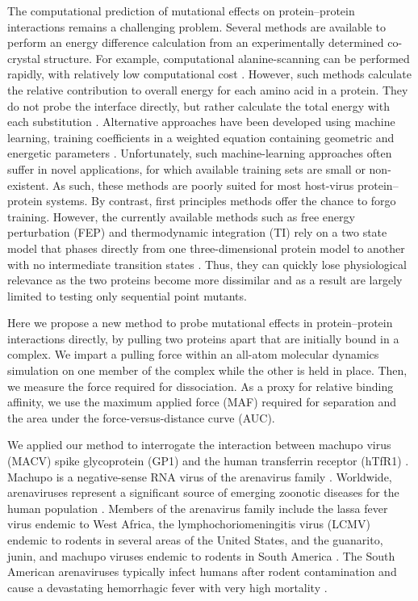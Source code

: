 \documentclass[12pt]{article}
\begin{document}
The computational prediction of mutational effects on protein--protein interactions remains a challenging problem. Several methods are available to perform an energy difference calculation from an experimentally determined co-crystal structure. For example, computational alanine-scanning can be performed rapidly, with relatively low computational cost \citep{Grant2011,Kortemme2004}. However, such methods calculate the relative contribution to overall energy for each amino acid in a protein. They do not probe the interface directly, but rather calculate the total energy with each substitution \citep{Grant2011,Kortemme2004}. Alternative approaches have been developed using machine learning, training coefficients in a weighted equation containing geometric and energetic parameters \citep{Vreven2011,Vreven2012,Bajaj2011,Hwang2010}. Unfortunately, such machine-learning approaches often suffer in novel applications, for which available training sets are small or non-existent. As such, these methods are poorly suited for most host-virus protein--protein systems. By contrast, first principles methods offer the chance to forgo training. However, the currently available methods such as free energy perturbation (FEP) and thermodynamic integration (TI) rely on a two state model that phases directly from one three-dimensional protein model to another with no intermediate transition states \citep{Gilson1997,Lu2004}. Thus, they can quickly lose physiological relevance as the two proteins become more dissimilar and as a result are largely limited to testing only sequential point mutants. 

Here we propose a new method to probe mutational effects in protein--protein interactions directly, by pulling two proteins apart that are initially bound in a complex. We impart a pulling force within an all-atom molecular dynamics simulation on one member of the complex while the other is held in place. Then, we measure the force required for dissociation. As a proxy for relative binding affinity, we use the maximum applied force (MAF) required for separation and the area under the force-versus-distance curve (AUC). 

We applied our method to interrogate the interaction between machupo virus (MACV) spike glycoprotein (GP1) and the human transferrin receptor (hTfR1) \citep{Abraham2010,Charrel2003}. Machupo is a negative-sense RNA virus of the arenavirus family \citep{Charrel2003}. Worldwide, arenaviruses represent a significant source of emerging zoonotic diseases for the human population \citep{Charrel2003}. Members of the arenavirus family include the lassa fever virus endemic to West Africa, the lymphochoriomeningitis virus (LCMV) endemic to rodents in several areas of the United States, and the guanarito, junin, and machupo viruses endemic to rodents in South America \citep{Charrel2003}. The South American arenaviruses typically infect humans after rodent contamination and cause a devastating hemorrhagic fever with very high mortality \citep{Charrel2003}.
\end{document}
